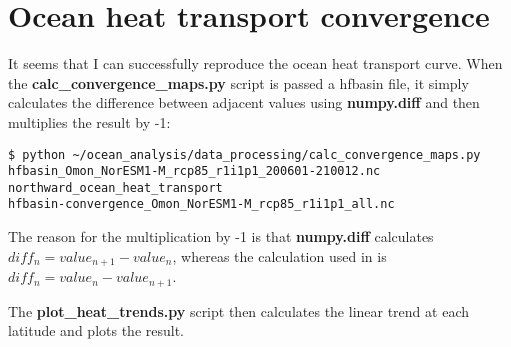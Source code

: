 \section{Ocean heat transport convergence}

It seems that I can successfully reproduce the ocean heat transport curve. When the \textbf{calc_convergence_maps.py} script is passed a hfbasin file, it simply calculates the difference between adjacent values using \textbf{numpy.diff} and then multiplies the result by -1:

\begin{verbatim}
$ python ~/ocean_analysis/data_processing/calc_convergence_maps.py
hfbasin_Omon_NorESM1-M_rcp85_r1i1p1_200601-210012.nc
northward_ocean_heat_transport
hfbasin-convergence_Omon_NorESM1-M_rcp85_r1i1p1_all.nc
\end{verbatim}

The reason for the multiplication by -1 is that \textbf{numpy.diff} calculates $diff_{n} = value_{n+1} - value_{n}$, whereas the calculation used in \citep{Nummelin_2017} is $diff_{n} = value_{n} - value_{n+1}$.    

The \textbf{plot_heat_trends.py} script then calculates the linear trend at each latitude and plots the result. 